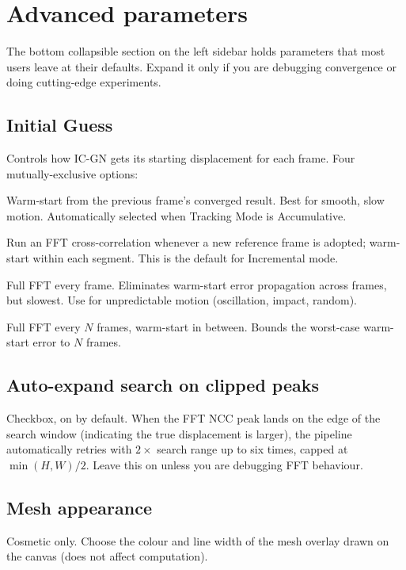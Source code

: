 \section{Advanced parameters}
\label{sec:advanced}

The bottom collapsible section on the left sidebar holds parameters
that most users leave at their defaults. Expand it only if you are
debugging convergence or doing cutting-edge experiments.

\subsection{Initial Guess}

Controls how IC-GN gets its starting displacement for each frame.
Four mutually-exclusive options:

\begin{description}[leftmargin=1.2cm,style=nextline]
  \item[Previous frame (default, fastest)]
    Warm-start from the previous frame's converged result. Best for
    smooth, slow motion. Automatically selected when Tracking Mode is
    Accumulative.
  \item[FFT when reference frame updates]
    Run an FFT cross-correlation whenever a new reference frame is
    adopted; warm-start within each segment. This is the default for
    Incremental mode.
  \item[FFT every frame (safest)]
    Full FFT every frame. Eliminates warm-start error propagation
    across frames, but slowest. Use for unpredictable motion
    (oscillation, impact, random).
  \item[Reset FFT every N frames]
    Full FFT every $N$ frames, warm-start in between. Bounds the
    worst-case warm-start error to $N$ frames.
\end{description}

\subsection{Auto-expand search on clipped peaks}

Checkbox, on by default. When the FFT NCC peak lands on the edge of
the search window (indicating the true displacement is larger), the
pipeline automatically retries with $2\times$ search range up to six
times, capped at $\min(H, W) / 2$. Leave this on unless you are
debugging FFT behaviour.

\subsection{Mesh appearance}

Cosmetic only. Choose the colour and line width of the mesh overlay
drawn on the canvas (does not affect computation).
